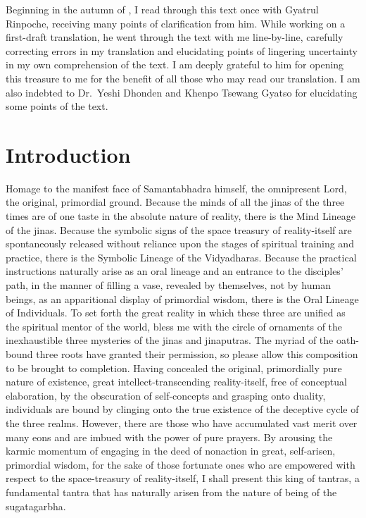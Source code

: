 \documentclass[a4paper,11pt,twoside,final]{book}
\begin{document}
Beginning in the autumn of , I read through this
text once with Gyatrul Rinpoche, receiving many points of
clarification from him. While working on a first-draft translation, he
went through the text with me line-by-line, carefully correcting
errors in my translation and elucidating points of lingering
uncertainty in my own comprehension of the text. I am deeply grateful
to him for opening this treasure to me for the benefit of all those
who may read our translation. I am also indebted to Dr.~Yeshi Dhonden
and Khenpo Tsewang Gyatso for elucidating some points of the text.

\chapter{Introduction}

Homage to the manifest face of Samantabhadra himself, the omnipresent
Lord, the original, primordial ground. Because the minds of all the
jinas of the three times are of one taste in the absolute nature of
reality, there is the Mind Lineage of the jinas. Because the symbolic
signs of the space treasury of reality-itself are spontaneously
released without reliance upon the stages of spiritual training and
practice, there is the Symbolic Lineage of the Vidyadharas. Because
the practical instructions naturally arise as an oral lineage and an
entrance to the disciples' path, in the manner of filling a vase,
revealed by themselves, not by human beings, as an apparitional
display of primordial wisdom, there is the Oral Lineage of
Individuals. To set forth the great reality in which these three are
unified as the spiritual mentor of the world, bless me with the circle
of ornaments of the inexhaustible three mysteries of the jinas and
jinaputras. The myriad of the oath-bound three roots have granted
their permission, so please allow this composition to be brought to
completion.  Having concealed the original, primordially pure nature
of existence, great intellect-transcending reality-itself, free of
conceptual elaboration, by the obscuration of self-concepts and
grasping onto duality, individuals are bound by clinging onto the true
existence of the deceptive cycle of the three realms.  However, there
are those who have accumulated vast merit over many eons and are
imbued with the power of pure prayers. By arousing the karmic momentum
of engaging in the deed of nonaction in great, self-arisen, primordial
wisdom, for the sake of those fortunate ones who are empowered with
respect to the space-treasury of reality-itself, I shall present this
king of tantras, a fundamental tantra that has naturally arisen from
the nature of being of the sugatagarbha.
\end{document}
